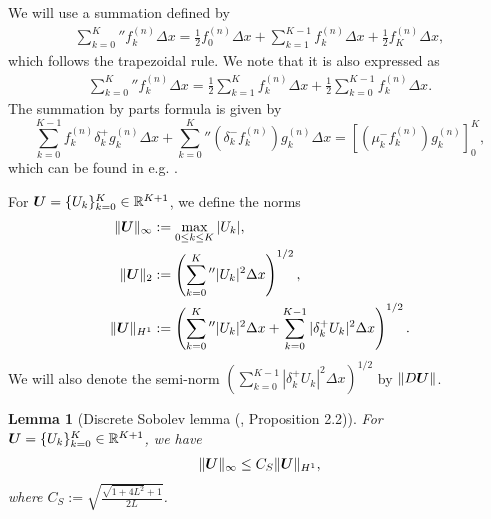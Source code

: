 \documentclass[dvipdfmx-if-dvi,autodetect-engine,ja=standard]{amsart}
\numberwithin{equation}{section} %
\def\vect#1{\mbox{\boldmath $#1$}} %
\newtheorem{lemma}[definition]{Lemma}
\begin{document}
We will use a summation defined by
\begin{align}
    \sum_{k=0}^K{}'' f_k^{(n)} \Delta x
    = \frac{1}{2} f_0^{(n)}\Delta x
    + \sum_{k=1}^{K-1} f_k^{(n)} \Delta x
    + \frac{1}{2} f_K^{(n)} \Delta x,
\end{align}
which follows the trapezoidal rule. 
We note that it is also expressed as
\begin{align}
     \sum_{k=0}^K{}'' f_k^{(n)} \Delta x
    = \frac{1}{2} \sum_{k=1}^K f_{k}^{(n)} \Delta x
    + \frac{1}{2} \sum_{k=0}^{K-1} f_{k}^{(n)} \Delta x.
\end{align}
The summation by parts formula is given by
\begin{equation}\label{sbp}
    \sum_{k=0}^{K-1} f_k^{(n)} \delta_k^+ g_k^{(n)} \Delta x
    + \sum_{k=0}^K{}'' (\delta_k^- f_k^{(n)}) g_k^{(n)} \Delta x
    =
    \left[ \left( \mu_k^- f_k^{(n)} \right) g_k^{(n)}
    \right]_0^K, 
\end{equation}
which can be found in e.g. \cite{5}. 

For
$\vect{U} = \{ U_k \}_{k=0}^K \in \mathbb{R}^{K+1}$,
we define the norms 
\begin{align}
    \| \vect{U} \|_{\infty}
    &:= \max_{0\le k \le K} |U_k|,\\
    \| \vect{U} \|_2
    &:= \left( \sum_{k=0}^{K}{}'' |U_k|^2 \Delta x \right)^{1/2},\\
    \| \vect{U} \|_{H^1}
    &:= \left(
        \sum_{k=0}^K{}'' |U_k|^2 \Delta x
        + \sum_{k=0}^{K-1} |\delta_k^+ U_k|^2 \Delta x
    \right)^{1/2}.
\end{align}
We will also denote the semi-norm $(\sum_{k=0}^{K-1} |\delta_k^+ U_k|^2 \Delta x)^{1/2}$ by $\| D \vect{U} \|$. 
\begin{lemma}[Discrete Sobolev lemma (\cite{yo2}, Proposition 2.2)]\label{lem:Sobolev}
For $\vect{U} = \{ U_k \}_{k=0}^{K} \in \mathbb{R}^{K+1}$,
we have
\begin{align}
    \| \vect{U} \|_{\infty}
    \le C_S
    \| \vect{U} \|_{H^1}, 
\end{align}
where $C_S := \sqrt{\frac{\sqrt{1+4L^2}+1}{2L}}$. 
\end{lemma}


\end{document}
